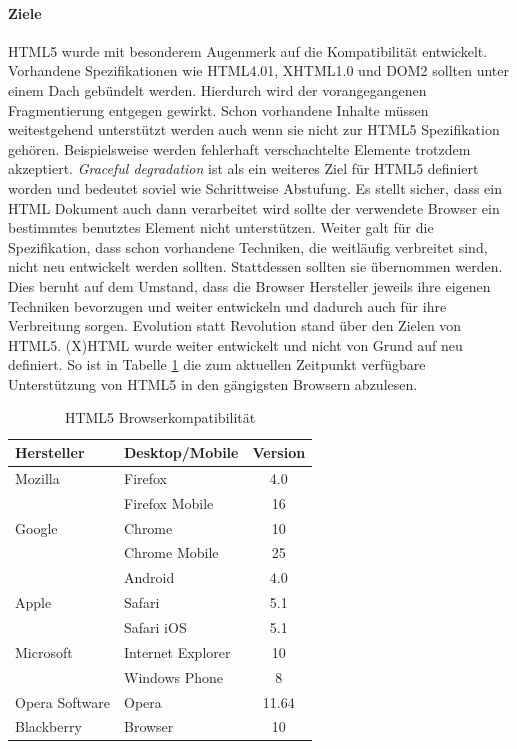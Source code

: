 \documentclass[12pt,a4paper,bibliography=totocnumbered,listof=totocnumbered]{scrartcl}
\begin{document}
\paragraph{Ziele} \ac{HTML}5 wurde mit besonderem Augenmerk auf die Kompatibilität entwickelt. Vorhandene Spezifikationen wie \ac{HTML}4.01, \ac{XHTML}1.0 und \ac{DOM}2 sollten unter einem Dach gebündelt werden. Hierdurch wird der vorangegangenen Fragmentierung entgegen gewirkt. Schon vorhandene Inhalte müssen weitestgehend unterstützt werden auch wenn sie nicht zur \ac{HTML}5 Spezifikation gehören. Beispielsweise werden fehlerhaft verschachtelte Elemente trotzdem akzeptiert. \textit{Graceful degradation} ist als ein weiteres Ziel für HTML5 definiert worden und bedeutet soviel wie \glqq Schrittweise Abstufung\grqq{}. Es stellt sicher, dass ein HTML Dokument auch dann verarbeitet wird sollte der verwendete Browser ein bestimmtes benutztes Element nicht unterstützen. Weiter galt für die Spezifikation, dass schon vorhandene Techniken, die weitläufig verbreitet sind, nicht neu entwickelt werden sollten. Stattdessen sollten sie übernommen werden. Dies beruht auf dem Umstand, dass die Browser Hersteller jeweils ihre eigenen Techniken bevorzugen und weiter entwickeln und dadurch auch für ihre Verbreitung sorgen. Evolution statt Revolution stand über den Zielen von HTML5. (X)HTML wurde weiter entwickelt und nicht von Grund auf neu definiert. So ist in Tabelle \ref{tab:html5browserkomp} die zum aktuellen Zeitpunkt verfügbare Unterstützung von HTML5 in den gängigsten Browsern abzulesen.

\vspace{1em}
\begin{table}[!h]
	\centering
	\begin{tabular}{|l|l|c|}
		\hline
		\textbf{Hersteller} & \textbf{Desktop/Mobile} & \textbf{Version}\\
		\hline
		Mozilla & Firefox & 4.0\\
		\hline
		 & Firefox Mobile & 16\\
		\hline
		Google & Chrome & 10\\
		\hline
		 & Chrome Mobile & 25\\
		\hline
		 & Android & 4.0\\
		\hline
		Apple & Safari & 5.1\\
		\hline
		 & Safari iOS & 5.1\\
		\hline
		Microsoft & Internet Explorer & 10\\
		\hline
		 & Windows Phone & 8\\
		\hline
		Opera Software & Opera & 11.64\\
		\hline
		Blackberry & Browser & 10\\
		\hline
	\end{tabular}
	\caption{HTML5 Browserkompatibilität}
	\label{tab:html5browserkomp}
\end{table}
\end{document}

